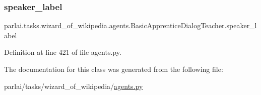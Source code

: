 \subsubsection{\texorpdfstring{speaker\+\_\+label}{speaker\_label}}
{\footnotesize\ttfamily parlai.\+tasks.\+wizard\+\_\+of\+\_\+wikipedia.\+agents.\+Basic\+Apprentice\+Dialog\+Teacher.\+speaker\+\_\+label}



Definition at line 421 of file agents.\+py.



The documentation for this class was generated from the following file\+:\begin{DoxyCompactItemize}
\item 
parlai/tasks/wizard\+\_\+of\+\_\+wikipedia/\hyperlink{parlai_2tasks_2wizard__of__wikipedia_2agents_8py}{agents.\+py}\end{DoxyCompactItemize}
